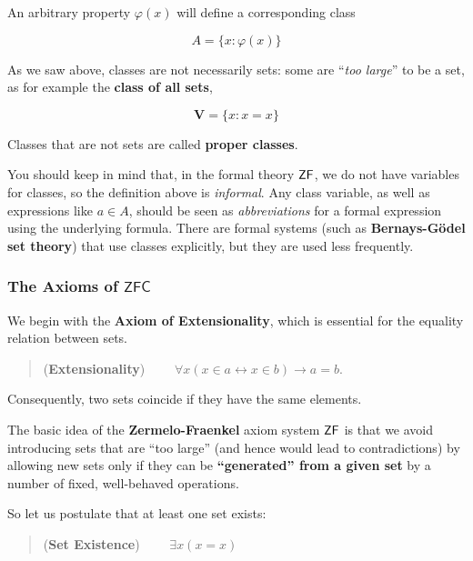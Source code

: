 An arbitrary property $\varphi(x)$ will define a corresponding class

\begin{equation}
A = \{x \colon \varphi(x)\}
\end{equation}

As we saw above, classes are not necessarily sets: some are ``\textit{too large}'' to be a set, as for example the \textbf{class of all sets},

\begin{equation}
\mathbf{V} = \{ x \colon x = x \}
\end{equation}

Classes that are not sets are called \textbf{proper classes}.

You should keep in mind that, in the formal theory $\mathsf{ZF}$, we do not have variables for classes, so the definition above is \textit{informal}.  Any class variable, as well as expressions like $a \in A$, should be seen as \textit{abbreviations} for a formal expression using the underlying formula.
There are formal systems (such as \textbf{Bernays-Gödel set theory}) that use classes explicitly, but they are used less frequently.

\subsubsection{The Axioms of $\mathsf{ZFC}$}

We begin with the \textbf{Axiom of Extensionality}, which is essential for the equality relation between sets.

\begin{quote}
(\textbf{Extensionality})  $\qquad \forall x (x \in a  \leftrightarrow x \in b)  \to a=b.$
\end{quote}

Consequently, two sets coincide if they have the same elements.

The basic idea of the \textbf{Zermelo-Fraenkel} axiom system $\mathsf{ZF}$ is that we avoid introducing sets that are ``too large'' (and hence would lead to contradictions) by allowing new sets only if they can be \textbf{``generated'' from a given set} by a number of fixed, well-behaved operations.

So let us postulate that at least one set exists:

\begin{quote}
(\textbf{Set Existence}) $\qquad \exists x ( x = x )$
\end{quote}

